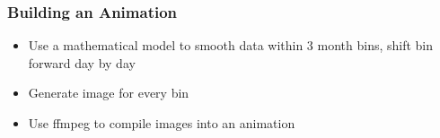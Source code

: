\documentclass[xcolor=dvipsnames, 9pt]{beamer}
\begin{document}
\begin{frame}[fragile]
  \frametitle{Building an Animation}
  
  \begin{itemize}
    \item{Use a mathematical model to smooth data within 3 month bins, shift bin forward day by day}
    \item{Generate image for every bin}
    \item{Use ffmpeg to compile images into an animation}
  \end{itemize}
\end{frame}


\end{document}
